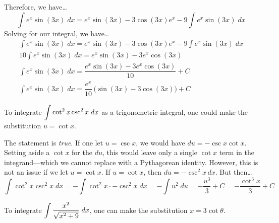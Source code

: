 \documentclass[11pt,letterpaper]{article}
\begin{document}
Therefore, we have\dots
	\[
	\int e^x \sin(3x) \;dx= e^x \sin(3x) - 3 \cos(3x) e^x - 9 \int e^x \sin(3x) \;dx
	\]
Solving for our integral, we have\dots
	\[
	\begin{gathered}
	\int e^x \sin(3x) \;dx= e^x \sin(3x) - 3 \cos(3x) e^x - 9 \int e^x \sin(3x) \;dx \\[0.2cm]
	10 \int e^x \sin(3x) \;dx= e^x \sin(3x) - 3 e^x \cos(3x) \\[0.2cm]
	\int e^x \sin(3x) \;dx= \dfrac{e^x \sin(3x) - 3 e^x \cos(3x)}{10} + C \\[0.2cm]
	\int e^x \sin(3x) \;dx= \dfrac{e^x}{10} \,\big( \sin(3x) - 3 \cos(3x) \big) + C
	\end{gathered}
	\] \pvspace{1.3cm}



 To integrate $\displaystyle\int \cot^2 x \csc^2 x \;dx$ as a trigonometric integral, one could make the substitution $u= \cot x$. \pspace

\sol The statement is \textit{true}. If one let $u= \csc x$, we would have $du= -\csc x \cot x$. Setting aside a $\cot x$ for the $du$, this would leave only a single $\cot x$ term in the integrand---which we cannot replace with a Pythagorean identity. However, this is not an issue if we let $u= \cot x$. If $u= \cot x$, then $du= -\csc^2 x \,dx$. But then\dots
	\[
	\int \cot^2 x \csc^2 x \;dx= -\int \cot^2 x \cdot -\csc^2 x \;dx= -\int u^2 \;du= -\dfrac{u^3}{3} + C= -\dfrac{\cot^3 x}{3} + C
	\] \pvspace{1.3cm}



 To integrate $\displaystyle\int \dfrac{x^2}{\sqrt{x^2 + 9}} \;dx$, one can make the substitution $x= 3 \cot \theta$. \pspace
\end{document}
